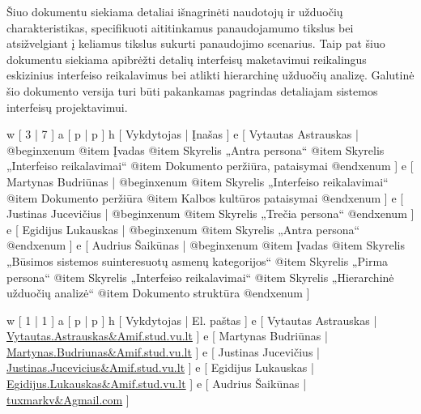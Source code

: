 
Šiuo dokumentu siekiama detaliai išnagrinėti naudotojų ir
užduočių charakteristikas, specifikuoti aititinkamus panaudojamumo
tikslus bei atsižvelgiant į keliamus tikslus sukurti panaudojimo
scenarius. Taip pat šiuo dokumentu siekiama apibrėžti detalių
interfeisų maketavimui reikalingus eskizinius interfeiso reikalavimus
bei atlikti hierarchinę užduočių analizę. Galutinė šio dokumento
versija turi būti pakankamas pagrindas detaliajam sistemos interfeisų
projektavimui.

\xtable
{
  w [ 3  | 7 ]
  a [ p  | p ]
  h [ Vykdytojas | Įnašas ]
  e [ Vytautas Astrauskas
  | @begin{xenum} 
      @item Įvadas
      @item Skyrelis „Antra persona“
      @item Skyrelis „Interfeiso reikalavimai“
      @item Dokumento peržiūra, pataisymai
    @end{xenum}
  ]
  e [ Martynas Budriūnas
  | @begin{xenum} 
      @item Skyrelis „Interfeiso reikalavimai“
      @item Dokumento peržiūra
      @item Kalbos kultūros pataisymai
    @end{xenum}
  ]
  e [ Justinas Jucevičius 
  | @begin{xenum} 
      @item Skyrelis „Trečia persona“
    @end{xenum}
  ]
  e [ Egidijus Lukauskas 
  | @begin{xenum} 
      @item Skyrelis „Antra persona“
    @end{xenum}
  ]
  e [ Audrius Šaikūnas 
  | @begin{xenum} 
      @item Įvadas
      @item Skyrelis „Būsimos sistemos suinteresuotų asmenų kategorijos“
      @item Skyrelis „Pirma persona“
      @item Skyrelis „Interfeiso reikalavimai“
      @item Skyrelis „Hierarchinė užduočių analizė“
      @item Dokumento struktūra
    @end{xenum}
  ]
}

\xtableu
{
  w [ 1 | 1 ]
  a [ p | p ]
  h [ Vykdytojas | El. paštas ]
  e [ Vytautas Astrauskas | \url{Vytautas.Astrauskas&Amif.stud.vu.lt} ]
  e [ Martynas Budriūnas  | \url{Martynas.Budriunas&Amif.stud.vu.lt} ]
  e [ Justinas Jucevičius | \url{Justinas.Jucevicius&Amif.stud.vu.lt} ]
  e [ Egidijus Lukauskas  | \url{Egidijus.Lukauskas&Amif.stud.vu.lt} ]
  e [ Audrius Šaikūnas    | \url{tuxmarkv&Agmail.com} ]
}
